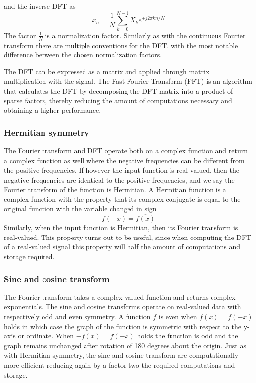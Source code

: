 and the inverse DFT as
\begin{equation}
 x_n = \frac{1}{N} \sum_{k=0}^{N-1} X_k e^{+j 2 \pi k n/N}
\end{equation}
The factor $\frac{1}{N}$ is a normalization factor. Similarly as with the
continuous Fourier transform there are multiple conventions for the DFT, with
the most notable difference between the chosen normalization factors.

The DFT can be expressed as a matrix and applied through matrix multiplication
with the signal. The Fast Fourier Transform (FFT) is an algorithm that
calculates the DFT by decomposing the DFT matrix into a product of sparse
factors, thereby reducing the amount of computations necessary and obtaining a
higher performance.


\subsubsection{Hermitian symmetry}
The Fourier transform and DFT operate both on a complex function and return a
complex function as well where the negative frequencies can be different from
the positive frequencies. If however the input function is real-valued, then the
negative frequencies are identical to the positive frequencies, and we say the
Fourier transform of the function is Hermitian. A Hermitian function is a
complex function with the property that its complex conjugate is equal to the
original function with the variable changed in sign
\begin{equation}
 f(-x) = \overline{f(x)}
\end{equation}
Similarly, when the input function is Hermitian, then its Fourier transform is
real-valued. This property turns out to be useful, since when computing the DFT
of a real-valued signal this property will half the amount of computations and
storage required.

\subsubsection{Sine and cosine transform}
The Fourier transform takes a complex-valued function and returns complex
exponentials. The sine and cosine transforms operate on real-valued data with
respectively odd and even symmetry. A function $f$ is even when $f(x)=f(-x)$
holds in which case the graph of the function is symmetric with respect to the
y-axis or ordinate. When $-f(x)=f(-x)$ holds the function is odd and the graph
remains unchanged after rotation of 180 degrees about the origin. Just as with
Hermitian symmetry, the sine and cosine transform are computationally more
efficient reducing again by a factor two the required computations and storage.

